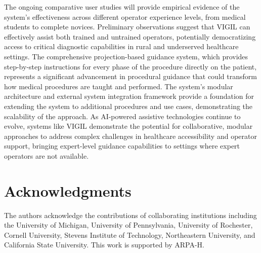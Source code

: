 \documentclass[12pt,a4paper]{article}
\begin{document}
The ongoing comparative user studies will provide empirical evidence of the system's effectiveness across different operator experience levels, from medical students to complete novices. Preliminary observations suggest that VIGIL can effectively assist both trained and untrained operators, potentially democratizing access to critical diagnostic capabilities in rural and underserved healthcare settings. The comprehensive projection-based guidance system, which provides step-by-step instructions for every phase of the procedure directly on the patient, represents a significant advancement in procedural guidance that could transform how medical procedures are taught and performed. The system's modular architecture and external system integration framework provide a foundation for extending the system to additional procedures and use cases, demonstrating the scalability of the approach. As AI-powered assistive technologies continue to evolve, systems like VIGIL demonstrate the potential for collaborative, modular approaches to address complex challenges in healthcare accessibility and operator support, bringing expert-level guidance capabilities to settings where expert operators are not available.

\section*{Acknowledgments}

The authors acknowledge the contributions of collaborating institutions including the University of Michigan, University of Pennsylvania, University of Rochester, Cornell University, Stevens Institute of Technology, Northeastern University, and California State University. This work is supported by ARPA-H.
\end{document}

